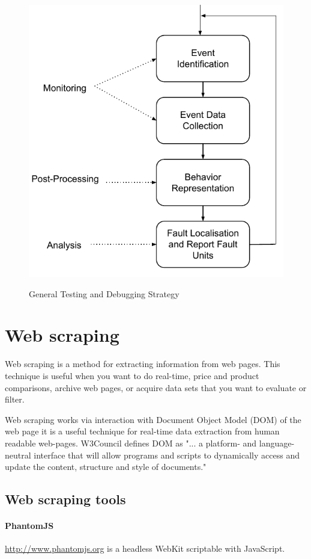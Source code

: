 \begin{figure}[ht]
	\centering
	\includegraphics[width=0.7\linewidth]{grafiken/GeneralTestingAndDebugging}
	\label{fig:GeneralTestingAndDebugging}
	\caption{General Testing and Debugging Strategy\cite{rtSandD}}
\end{figure}

\section{Web scraping}
\label{sec:scraping}
Web scraping is a method for extracting information from web pages\cite{wikiScraping}. This technique is useful when you want to do real-time, price and product comparisons, archive web pages, or acquire data sets that you want to evaluate or filter\cite{conScrap}.

Web scraping works via interaction with Document Object Model (DOM) of the web page it is a useful technique for real-time data extraction from human readable web-pages. W3Council \cite{w3cDOM} defines DOM as "... a platform- and language-neutral interface that will allow programs and scripts to dynamically access and update the content, structure and style of documents." 

\subsection{Web scraping tools}

\paragraph{PhantomJS}\cite{phantom} \url{http://www.phantomjs.org} is a headless WebKit scriptable with JavaScript. 

